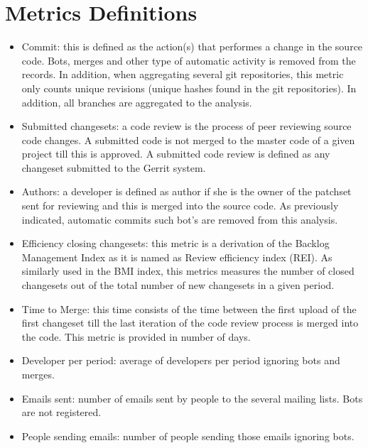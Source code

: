 \documentclass[a4wide,4pt]{article}
\begin{document}


\appendix{}

\section{Metrics Definitions} \label{metrics}
\label{chap:metrics_definitions}

\begin{itemize}
\item Commit: this is defined as the action(s) that performes a change in the source code. Bots, merges and other type of automatic activity is removed from the records. In addition, when aggregating several git repositories, this metric only counts unique revisions (unique hashes found in the git repositories). In addition, all branches are aggregated to the analysis.

\item Submitted changesets: a code review is the process of peer reviewing source code changes. A submitted code is not merged to the master code of a given project till this is approved. A submitted code review is defined as any changeset submitted to the Gerrit
system. 
 
\item Authors: a developer is defined as author if she is the owner of the patchset sent for reviewing and this is merged into the source code. As previously indicated, automatic commits such bot's are removed from this analysis.

\item Efficiency closing changesets: this metric is a derivation of the Backlog Management Index as it is named as Review efficiency index (REI). As similarly used in the BMI index, this metrics measures the number of closed changesets
 out of the total number of new changesets in a given period.

\item Time to Merge: this time consists of the time between the first upload of the first changeset till the last iteration of the code review process is merged into the code. This metric is provided in number of days.

\item Developer per period: average of developers per period ignoring bots and merges.

\item Emails sent: number of emails sent by people to the several mailing lists. Bots are not registered.

\item People sending emails: number of people sending those emails ignoring bots.

\end{itemize}
\end{document}
